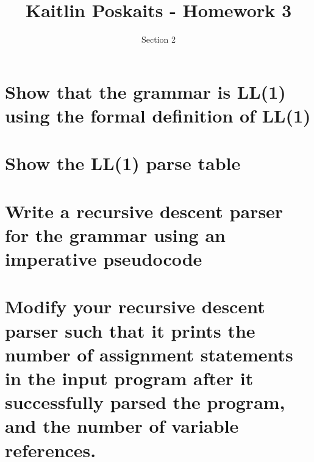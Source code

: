 \documentclass[11pt]{article}
\title{\bf Kaitlin Poskaits - Homework 3}
\author{Section 2}
\date{}
\begin{document}
\maketitle

\section{Show that the grammar is LL(1) using the formal definition of LL(1)}

\section{Show the LL(1) parse table}


\section{Write a recursive descent parser for the grammar using an imperative
pseudocode}

\section{Modify your recursive descent parser such that it prints the number of
assignment statements in the input program after it successfully parsed the
program, and the number of variable references.}
\end{document}
